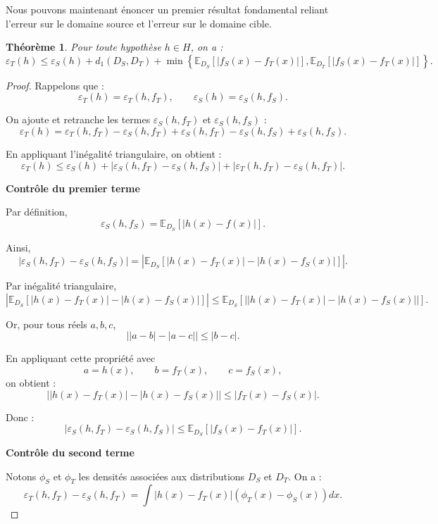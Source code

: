 \documentclass[a4paper,12pt]{article}
\newtheorem{theorem}{Théorème}
\theoremstyle{definition}
\theoremstyle{remark}
\begin{document}
Nous pouvons maintenant énoncer un premier résultat fondamental reliant l’erreur sur le domaine source et l’erreur sur le domaine cible.


\begin{theorem}
Pour toute hypothèse $h \in H$, on a :
\[
\varepsilon_T(h)
\leq
\varepsilon_S(h)
+
d_1(D_S,D_T)
+
\min
\left\{
\mathbb{E}_{D_S}[|f_S(x)-f_T(x)|],
\mathbb{E}_{D_T}[|f_S(x)-f_T(x)|]
\right\}.
\]
\end{theorem}

\begin{proof}
Rappelons que :
\[
\varepsilon_T(h)=\varepsilon_T(h,f_T),
\qquad
\varepsilon_S(h)=\varepsilon_S(h,f_S).
\]

On ajoute et retranche les termes
$\varepsilon_S(h,f_T)$ et $\varepsilon_S(h,f_S)$ :
\[
\varepsilon_T(h)
=
\varepsilon_T(h,f_T)
-\varepsilon_S(h,f_T)
+\varepsilon_S(h,f_T)
-\varepsilon_S(h,f_S)
+\varepsilon_S(h,f_S).
\]

En appliquant l’inégalité triangulaire, on obtient :
\[
\varepsilon_T(h)
\leq
\varepsilon_S(h)
+
|\varepsilon_S(h,f_T)-\varepsilon_S(h,f_S)|
+
|\varepsilon_T(h,f_T)-\varepsilon_S(h,f_T)|.
\]

\medskip

\textbf{Contrôle du premier terme}

Par définition,
\[
\varepsilon_S(h,f_S)
=
\mathbb{E}_{D_S}[|h(x)-f(x)|].
\]

Ainsi,
\[
|\varepsilon_S(h,f_T)-\varepsilon_S(h,f_S)|
=
\left|
\mathbb{E}_{D_S}
\left[
|h(x)-f_T(x)|
-
|h(x)-f_S(x)|
\right]
\right|.
\]

Par inégalité triangulaire,
\[
\left|
\mathbb{E}_{D_S}
\left[
|h(x)-f_T(x)|
-
|h(x)-f_S(x)|
\right]
\right|
\leq
\mathbb{E}_{D_S}
\left[
\big|
|h(x)-f_T(x)|
-
|h(x)-f_S(x)|
\big|
\right].
\]

Or, pour tous réels $a,b,c$,
\[
\big||a-b|-|a-c|\big|
\leq
|b-c|.
\]

En appliquant cette propriété avec
\[
a=h(x), \qquad b=f_T(x), \qquad c=f_S(x),
\]
on obtient :
\[
\big|
|h(x)-f_T(x)|
-
|h(x)-f_S(x)|
\big|
\leq
|f_T(x)-f_S(x)|.
\]

Donc :
\[
|\varepsilon_S(h,f_T)-\varepsilon_S(h,f_S)|
\leq
\mathbb{E}_{D_S}[|f_S(x)-f_T(x)|].
\]

\medskip

\textbf{Contrôle du second terme}

Notons $\phi_S$ et $\phi_T$ les densités associées aux distributions
$D_S$ et $D_T$. On a :
\[
\varepsilon_T(h,f_T)-\varepsilon_S(h,f_T)
=
\int
|h(x)-f_T(x)|
(\phi_T(x)-\phi_S(x))
dx.
\]


\end{proof}
\end{document}
